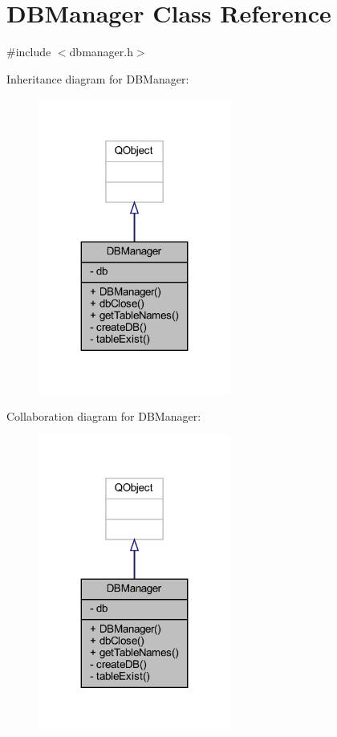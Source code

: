 \hypertarget{class_d_b_manager}{}\section{D\+B\+Manager Class Reference}
\label{class_d_b_manager}


{\ttfamily \#include $<$dbmanager.\+h$>$}



Inheritance diagram for D\+B\+Manager\+:
\nopagebreak
\begin{figure}[H]
\begin{center}
\leavevmode
\includegraphics[width=179pt]{class_d_b_manager__inherit__graph}
\end{center}
\end{figure}


Collaboration diagram for D\+B\+Manager\+:
\nopagebreak
\begin{figure}[H]
\begin{center}
\leavevmode
\includegraphics[width=179pt]{class_d_b_manager__coll__graph}
\end{center}
\end{figure}
